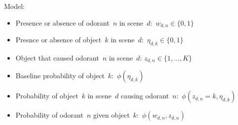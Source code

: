 Model:
\begin{itemize}
\item Presence or absence of odorant~$n$ in scene~$d$:~$w_{d,n} \in \{0,1\}$
\item Presnce or absence of object~$k$ in scene~$d$:~$\eta_{d,k} \in \{0,1\}$
\item Object that caused odorant~$n$ in scene~$d$: $z_{d,n} \in \{1, \ldots, K\}$ 
\item Baseline probability of object~$k$:~$\phi(\eta_{d,k})$
\item Probability of object~$k$ in scene~$d$ causing odorant~$n$:~$\phi(z_{d,n}=k, \eta_{d,k})$
\item Probability of odorant~$n$ given object~$k$:~$\phi(w_{d,n}, z_{d,n})$
\end{itemize}
